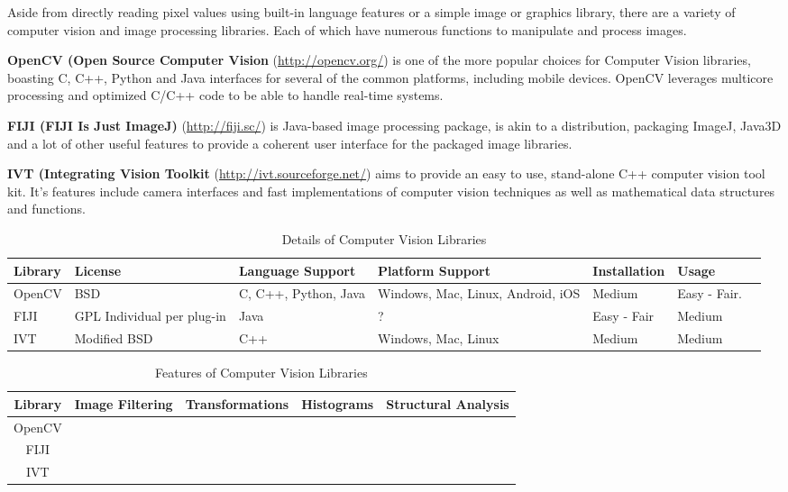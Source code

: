\documentclass[11pt,fleqn,twoside]{article}
\begin{document}
Aside from directly reading pixel values using built-in language features or a simple image or 
graphics library, there are a variety of computer vision and image processing libraries. Each of
which have numerous functions to manipulate and process images.

\textbf{OpenCV (Open Source Computer Vision} (\url{http://opencv.org/}) is one of the more popular 
choices for Computer Vision libraries, boasting C, C++, Python and Java interfaces for several of 
the common platforms, including mobile devices. OpenCV leverages multicore processing and 
optimized C/C++ code to be able to handle real-time systems.

\textbf{FIJI (FIJI Is Just ImageJ)} (\url{http://fiji.sc/}) is Java-based image processing package,
is akin to a distribution, packaging ImageJ, Java3D and a lot of other useful features to provide
a coherent user interface for the packaged image libraries.

\textbf{IVT (Integrating Vision Toolkit} (\url{http://ivt.sourceforge.net/}) aims to provide an
easy to use, stand-alone C++ computer vision tool kit. It's features include camera interfaces and
fast implementations of computer vision techniques as well as mathematical data structures and 
functions.



\begin{table}[p]
\begin{tabular}{| p{6em} | p{6em} | p{6em} | p{6em} | p{6em} | p{6em} | p{6em} |}
\hline
\textbf{Library} & \textbf{License} & \textbf{Language Support} & \textbf{Platform Support} & 
\textbf{Installation} & \textbf{Usage}\\ \hline

OpenCV & BSD & C, C++, Python, Java & Windows, Mac, Linux, Android, iOS & Medium & Easy - Fair. \\ \hline

FIJI & GPL \newline Individual per plug-in & Java & ? & Easy - Fair & Medium \\ \hline

IVT & Modified BSD & C++ & Windows, Mac, Linux & Medium & Medium \\ \hline

\hline
\end{tabular}
\caption{Details of Computer Vision Libraries}
\end{table}

\begin{table}[p]
\begin{tabular}{| c | c | c | c | c |}
\hline
\textbf{Library} & \textbf{Image Filtering} & \textbf{Transformations} & \textbf{Histograms} & \textbf{Structural Analysis} \\ \hline

OpenCV 	& \checkmark	& \checkmark	& \checkmark	& \checkmark 	\\ \hline
FIJI	& 		&		&		&		\\ \hline
IVT	&		&		&		&		\\ \hline
\end{tabular}
\caption{Features of Computer Vision Libraries}
\end{table}
\end{document}
